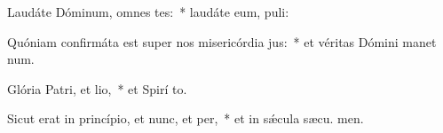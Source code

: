 \item Laudáte Dóminum, omnes tes:~* laudáte eum,  puli:
\item Quóniam confirmáta est super nos misericórdia jus:~* et véritas Dómini manet  num.
\item Glória Patri, et lio,~* et Spirí to.
\item Sicut erat in princípio, et nunc, et per,~* et in sǽcula sæcu. men.

